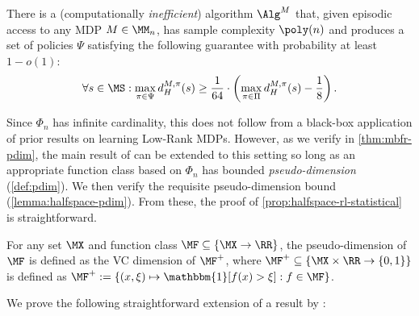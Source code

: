 \begin{proposition}\label{prop:halfspace-rl-statistical}
There is a (computationally \emph{inefficient}) algorithm $\Alg^M$ that, given episodic access to any MDP $M \in \MM_n$, has sample complexity $\poly(n)$ and produces a set of policies $\Psi$ satisfying the following guarantee with probability at least $1 - o(1)$:
\[\forall s \in \MS: \max_{\pi\in\Psi} d^{M,\pi}_H(s) \geq \frac{1}{64} \cdot \left(\max_{\pi\in\Pi} d^{M,\pi}_H(s) - \frac{1}{8}\right).\]
\end{proposition}

Since $\Phi_n$ has infinite cardinality, this does not follow from a black-box application of prior results on learning Low-Rank MDPs. However, as we verify in \cref{thm:mbfr-pdim}, the main result of \cite{mhammedi2023efficient} can be extended to this setting so long as an appropriate function class based on $\Phi_n$ has bounded \emph{pseudo-dimension} (\cref{def:pdim}). We then verify the requisite pseudo-dimension bound (\cref{lemma:halfspace-pdim}). From these, the proof of \cref{prop:halfspace-rl-statistical} is straightforward.

\begin{definition}\label{def:pdim}
For any set $\MX$ and function class $\MF \subseteq \{\MX \to \RR\}$, the pseudo-dimension of $\MF$ is defined as the VC dimension of $\MF^+$, where $\MF^+ \subseteq \{\MX\times\RR \to \{0,1\}\}$ is defined as $\MF^+ := \{(x,\xi) \mapsto \mathbbm{1}[f(x) > \xi]: f \in \MF\}$.
\end{definition}

We prove the following straightforward extension of a result by \cite{mhammedi2023efficient}:

